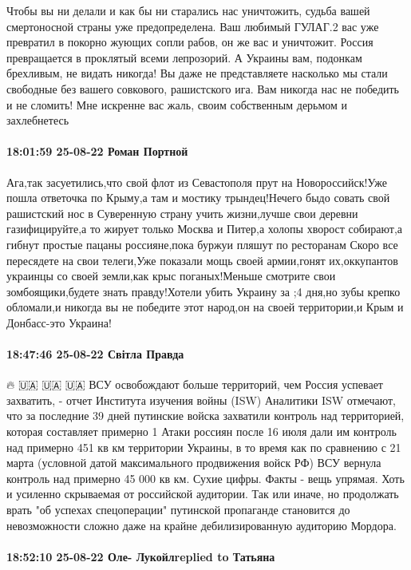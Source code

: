 Чтобы вы ни делали и как бы ни старались нас уничтожить, судьба вашей смертоносной страны уже предопределена.
Ваш любимый ГУЛАГ.2 вас уже превратил в покорно жующих сопли рабов, он же вас и уничтожит.
Россия превращается в проклятый всеми лепрозорий.
А Украины вам, подонкам брехливым, не видать никогда!
Вы даже не представляете насколько мы стали свободные без вашего совкового, рашистского ига.
Вам никогда нас не победить и не сломить!
Мне искренне вас жаль, своим собственным дерьмом и захлебнетесь

\paragraph{18:01:59 25-08-22 Роман Портной}

Ага,так засуетились,что свой флот из Севастополя прут на Новороссийск!Уже пошла
ответочка по Крыму,а там и мостику трындец!Нечего быдо совать свой рашистский
нос в Суверенную страну учить жизни,лучше свои деревни газифицируйте,а то
жирует только Москва и Питер,а холопы хворост собирают,а гибнут простые пацаны
россияне,пока буржуи пляшут по ресторанам Скоро все пересядете на свои
телеги,Уже показали мощь своей армии,гонят их,оккупантов украинцы со своей
земли,как крыс поганых!Меньше смотрите свои зомбоящики,будете знать
правду!Хотели убить Украину за ;4 дня,но зубы крепко обломали,и никогда вы не
победите этот народ,он на своей территории,и Крым и Донбасс-это Украина!

\paragraph{18:47:46 25-08-22 Світла Правда}

🔥 🇺🇦 🇺🇦 🇺🇦 ВСУ освобождают больше территорий, чем Россия успевает захватить, - отчет Института изучения войны (ISW)
Аналитики ISW отмечают, что за последние 39 дней путинские войска захватили контроль над территорией, которая составляет примерно 1%
Атаки россиян после 16 июля дали им контроль над примерно 451 кв км территории Украины, в то время как по сравнению с 21 марта (условной датой максимального продвижения войск РФ) ВСУ вернула контроль над примерно 45 000 кв км.
Сухие цифры. Факты - вещь упрямая. Хоть и усиленно скрываемая от российской аудитории. Так или иначе, но продолжать врать "об успехах спецоперации" путинской пропаганде становится до невозможности сложно даже на крайне дебилизированную аудиторию Мордора.

\paragraph{18:52:10 25-08-22 Оле- Лукойлreplied to Татьяна}


